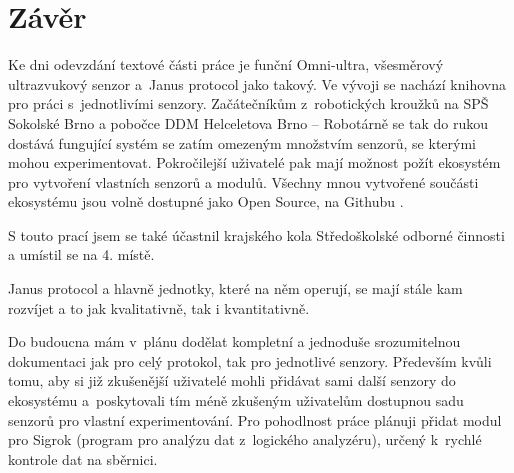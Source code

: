 \newpage
\chapter*{Závěr}

Ke dni odevzdání textové části práce je funční Omni-ultra, všesměrový ultrazvukový senzor a~Janus protocol jako takový.
Ve vývoji se nachází knihovna pro práci s~jednotlivími senzory.
Začátečníkům z~robotických kroužků na SPŠ Sokolské Brno \cite{sokolska} a pobočce DDM Helceletova Brno -- Robotárně \cite{robotarna} se tak do rukou dostává fungující systém se zatím omezeným množstvím senzorů, se kterými mohou experimentovat.
Pokročilejší uživatelé pak mají možnost požít ekosystém pro vytvoření vlastních senzorů a modulů.
Všechny mnou vytvořené součásti ekosystému jsou volně dostupné jako Open Source, na Githubu \cite{protocol}.

S touto prací jsem se také účastnil krajského kola Středoškolské odborné činnosti a umístil se na 4. místě.


Janus protocol a hlavně jednotky, které na něm operují, se mají stále kam rozvíjet a to jak kvalitativně, tak i kvantitativně.

Do budoucna mám v~plánu dodělat kompletní a jednoduše srozumitelnou dokumentaci jak pro celý protokol, tak pro jednotlivé senzory.
Především kvůli tomu, aby si již zkušenější uživatelé mohli přidávat sami další senzory do ekosystému a~poskytovali tím méně zkušeným uživatelům dostupnou sadu senzorů pro vlastní experimentování.
Pro pohodlnost práce plánuji přidat modul pro Sigrok (program pro analýzu dat z~logického analyzéru), určený k~rychlé kontrole dat na sběrnici.
